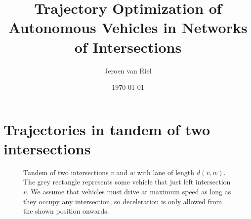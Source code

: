 \documentclass[a4paper]{article}
\author{Jeroen van Riel}
\date{\monthyeardate\today}
\title{Trajectory Optimization of Autonomous Vehicles in Networks of Intersections}
\theoremstyle{definition}
\theoremstyle{plain}
\begin{document}
\maketitle

\tableofcontents

\section{Trajectories in tandem of two intersections}

\begin{figure}
  \centering
  \caption{Tandem of two intersections $v$ and $w$ with lane of length $d(v,w)$.
    The grey rectangle represents some vehicle that just left intersection $v$.
    We assume that vehicles must drive at maximum speed as long as they occupy
    any intersection, so deceleration is only allowed from the shown position
    onwards.}
  \label{fig:tandem}
\end{figure}
\end{document}
